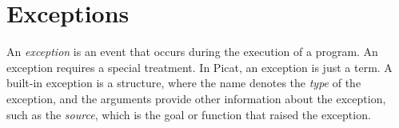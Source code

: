 \chapter{\label{chapter:exception}Exceptions}
An \emph{exception} is an event that occurs during the execution of a program.  An exception requires a special treatment. In Picat, an exception is just a term. A built-in exception is a structure, where the name denotes the \emph{type} of the exception, and the arguments provide other information about the exception, such as the \emph{source}, which is the goal or function that raised the exception.

